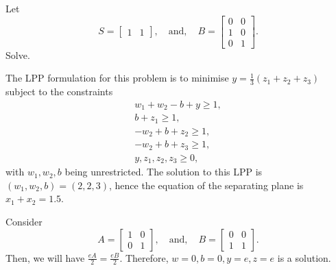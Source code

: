 \begin{question}
	Let
	$$S = \begin{bmatrix}
		1 & 1
	\end{bmatrix}, \quad \mathrm{and,} \quad
	B = \begin{bmatrix}
		0 & 0 \\ 1 & 0 \\ 0 & 1
	\end{bmatrix}.$$
	Solve.
\end{question}
\begin{solution}
	The LPP formulation for this problem is to minimise $y = \frac13(z_1+z_2+z_3)$ subject to the constraints
	\begin{align*}
		w_1+w_2-b+y \ge 1, \\
		b+z_1 \ge 1, \\
		-w_2 + b + z_2 \ge 1, \\
		-w_2 + b + z_3 \ge 1, \\
		y,z_1,z_2,z_3 \ge 0,
	\end{align*}
	with $w_1,w_2, b$ being unrestricted. The solution to this LPP is $(w_1,w_2,b)=(2,2,3)$, hence the equation of the separating plane is $x_1+x_2 = 1.5$.
\end{solution}

\begin{example}
	Consider 
	$$A = \begin{bmatrix}1&0\\0&1\end{bmatrix}, \quad \mathrm{and,}\quad
	B = \begin{bmatrix}0&0\\1&1\end{bmatrix}.$$
	Then, we will have $\frac{eA}{2} = \frac{eB}{2}$. Therefore, $w=0, b=0, y=e, z=e$ is a solution. 
\end{example}